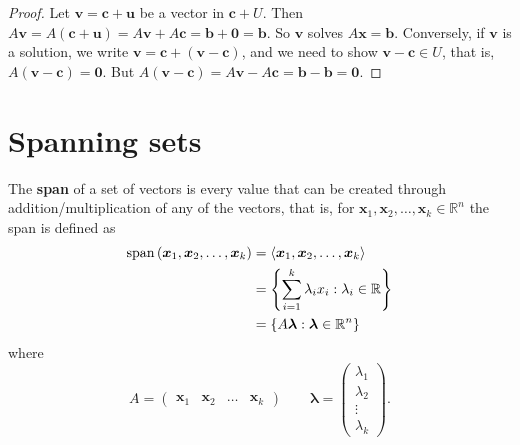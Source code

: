\begin{proof}
    Let $\bm v=\bm c+\bm u$ be a vector in $\bm c+U$. Then $A\bm v=A(\bm c+\bm u)=A\bm v+A\bm c=\bm b+\bm0=\bm b$. So $\bm v$ solves $A\bm x=\bm b$. Conversely, if $\bm v$ is a solution, we write $\bm v=\bm c+(\bm v-\bm c)$, and we need to show $\bm v-\bm c\in U$, that is, $A(\bm v-\bm c)=\bm 0$. But $A(\bm v-\bm c)=A\bm v-A\bm c=\bm b-\bm b=\bm0$.
\end{proof}

\section{Spanning sets}

\begin{definition}
    The \textbf{span} of a set of vectors is every value that can be created through addition/multiplication of any of the vectors, that is, for $\bm x_1,\bm x_2,\ldots,\bm x_k\in\mathbb R^n$ the span is defined as
    \begin{align*}
        \operatorname{span}{(\bm x_1,\bm x_2,\ldots,\bm x_k)}&=\langle\bm x_1,\bm x_2,\ldots,\bm x_k\rangle\\
        &=\left\{\sum_{i=1}^k\lambda_ix_i:\lambda_i\in\mathbb R\right\}\\
        &=\left\{A\bm\lambda:\bm\lambda\in\mathbb R^n\right\}
    \end{align*}
    where 
    \[
        A=
        \begin{pmatrix}
            \bm x_1&\bm x_2&\ldots&\bm x_k
        \end{pmatrix}
        \qquad\bm\lambda=
        \begin{pmatrix}
            \lambda_1\\\lambda_2\\\vdots\\\lambda_k
        \end{pmatrix}
        .
    \]
\end{definition}

